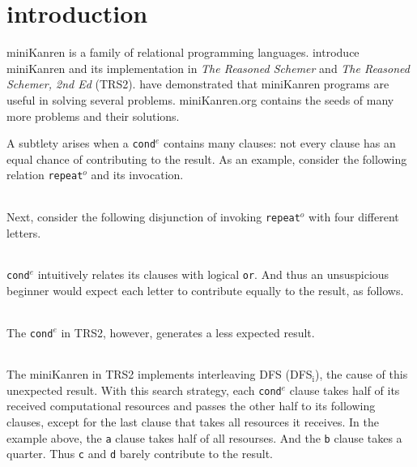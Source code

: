 \documentclass[format=acmlarge, review=true, authordraft=true]{acmart}
\newcommand{\conde}{\texttt{cond$^e$}}
\newcommand{\clisting}[1]{
\begin{center}
  \begin{tabular}{c}
	
    \end{tabular}
\end{center}
}
\newcommand{\repeato}{\texttt{repeat$^o$}}
\newcommand{\DFSi }[0]{DFS$_\textrm{i}$}
\begin{document}
\maketitle

\section{introduction}

miniKanren is a family of relational programming languages.
\citep{Friedman:2005:RS:1121583} \citet{friedman_reasoned_2018} introduce 
miniKanren and its implementation in \emph{The Reasoned Schemer} 
and \emph{The Reasoned Schemer, 2nd Ed} (TRS2). \citet{byrd2017unified} have 
demonstrated that miniKanren programs are useful in solving several problems.
miniKanren.org contains the seeds of many more problems and their solutions.


A subtlety arises 
when a \conde{} contains many clauses: not every clause has an 
equal chance of contributing to the result. As an example, consider the following 
relation \repeato{} and its invocation. 

\clisting{Figures/repeato.rkt}

Next, consider the following disjunction of invoking \repeato{} with four 
different letters.

\clisting{Figures/example.rkt}

\conde{} intuitively relates its clauses with logical \texttt{or}. And thus an 
unsuspicious beginner would expect each letter to contribute equally to the 
result, as follows.

\clisting{Figures/run-repeato-fair.rkt}

The \conde{} in TRS2, however, generates a less expected result.

\clisting{Figures/run-repeato-idfs.rkt}

The miniKanren in TRS2 implements interleaving DFS (\DFSi), the cause of this 
unexpected result. With this search strategy, each \conde{} clause takes half 
of its received computational resources and passes the other half to its 
following clauses, except for the last clause that takes all resources it 
receives. In the example above, the \texttt{a} clause takes half of all 
resourses. And the \texttt{b} clause takes a quarter. Thus \texttt{c} and 
\texttt{d} barely contribute to the result.
\end{document}
